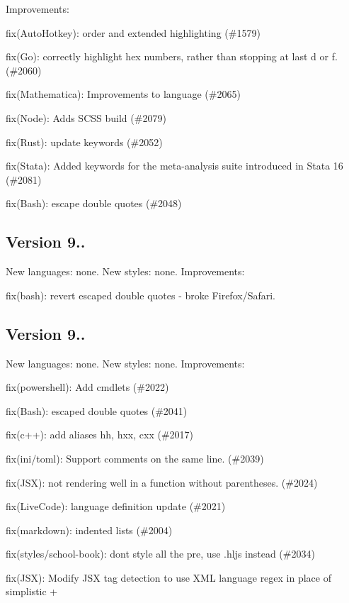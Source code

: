 Improvements\+:
\begin{DoxyItemize}
\item fix(\+Auto\+Hotkey)\+: order and extended highlighting (\#1579)
\item fix(\+Go)\+: correctly highlight hex numbers, rather than stopping at last \textquotesingle{}d\textquotesingle{} or \textquotesingle{}f\textquotesingle{}. (\#2060)
\item fix(\+Mathematica)\+: Improvements to language (\#2065)
\item fix(\+Node)\+: Adds S\+C\+SS build (\#2079)
\item fix(\+Rust)\+: update keywords (\#2052)
\item fix(\+Stata)\+: Added keywords for the meta-\/analysis suite introduced in Stata 16 (\#2081)
\item fix(\+Bash)\+: escape double quotes (\#2048)
\end{DoxyItemize}

\subsection*{Version 9..}

New languages\+: none. New styles\+: none. Improvements\+:
\begin{DoxyItemize}
\item fix(bash)\+: revert escaped double quotes -\/ broke Firefox/\+Safari.
\end{DoxyItemize}

\subsection*{Version 9..}

New languages\+: none. New styles\+: none. Improvements\+:
\begin{DoxyItemize}
\item fix(powershell)\+: Add cmdlets (\#2022)
\item fix(\+Bash)\+: escaped double quotes (\#2041)
\item fix(c++)\+: add aliases \textquotesingle{}hh\textquotesingle{}, \textquotesingle{}hxx\textquotesingle{}, \textquotesingle{}cxx\textquotesingle{} (\#2017)
\item fix(ini/toml)\+: Support comments on the same line. (\#2039)
\item fix(\+J\+S\+X)\+: not rendering well in a function without parentheses. (\#2024)
\item fix(\+Live\+Code)\+: language definition update (\#2021)
\item fix(markdown)\+: indented lists (\#2004)
\item fix(styles/school-\/book)\+: don\textquotesingle{}t style all the pre, use .hljs instead (\#2034)
\item fix(\+J\+S\+X)\+: Modify J\+SX tag detection to use X\+ML language regex in place of simplistic +
\end{DoxyItemize}

